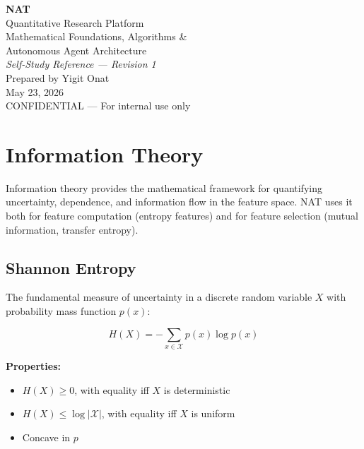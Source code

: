 \documentclass[11pt,a4paper]{article}
\begin{document}
\begin{titlepage}
\centering
\vspace*{3cm}
{\Huge\bfseries NAT\\[0.3cm]}
{\LARGE Quantitative Research Platform\\[0.5cm]}
{\Large Mathematical Foundations, Algorithms \&\\Autonomous Agent Architecture\\[0.3cm]}
{\large \textit{Self-Study Reference --- Revision 1}\\[2cm]}
{\large Prepared by Yigit Onat\\[0.3cm]}
{\large May 23, 2026\\[3cm]}
\vfill
{\small CONFIDENTIAL --- For internal use only}
\end{titlepage}

\tableofcontents
\newpage

\section{Information Theory}

Information theory provides the mathematical framework for quantifying uncertainty, dependence, and information flow in the feature space. NAT uses it both for feature computation (entropy features) and for feature selection (mutual information, transfer entropy).

\subsection{Shannon Entropy}

The fundamental measure of uncertainty in a discrete random variable $X$ with probability mass function $p(x)$:

\begin{equation}
H(X) = -\sum_{x \in \mathcal{X}} p(x) \log p(x)
\end{equation}

\textbf{Properties:}
\begin{itemize}
    \item $H(X) \geq 0$, with equality iff $X$ is deterministic
    \item $H(X) \leq \log |\mathcal{X}|$, with equality iff $X$ is uniform
    \item Concave in $p$
\end{itemize}
\end{document}
